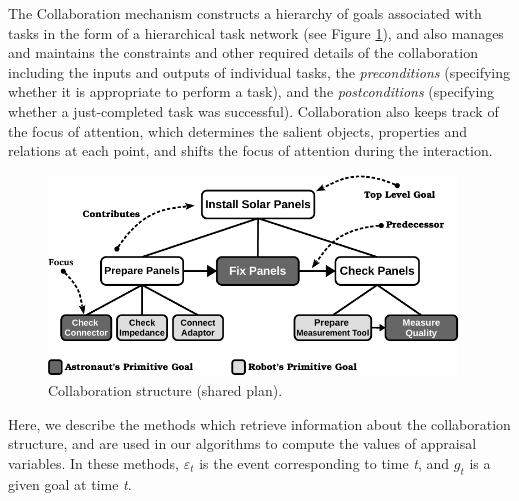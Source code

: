\documentclass[12pt]{report}
\begin{document}
The Collaboration mechanism constructs a hierarchy of goals associated with
tasks in the form of a hierarchical task network (see Figure \ref{fig:cs}), and
also manages and maintains the constraints and other required details of the
collaboration including the inputs and outputs of individual tasks, the
\textit{preconditions} (specifying whether it is appropriate to perform a task),
and the \textit{postconditions} (specifying whether a just-completed task was
successful). Collaboration also keeps track of the focus of attention, which
determines the salient objects, properties and relations at each point, and
shifts the focus of attention during the interaction.

\begin{figure}[t]
  \centering
  \includegraphics[width=0.97\textwidth]{figure/collaborationStructure-small-croped.pdf}
  \caption{{\fontsize{10}{10}\selectfont Collaboration structure (shared
  plan).}}
  \label{fig:cs}
  \vspace*{-5mm}
\end{figure}

Here, we describe the methods which retrieve information about the collaboration
structure, and are used in our algorithms to compute the values of appraisal
variables. In these methods, $\varepsilon_t$ is the event corresponding to time
\textit{t}, and $g_t$ is a given goal at time \textit{t}.
\end{document}
